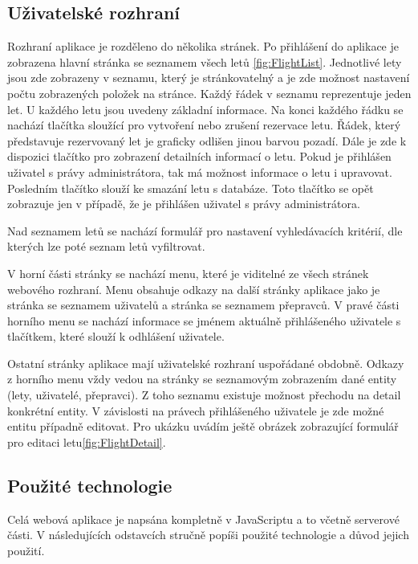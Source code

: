 \documentclass[ing,male,java,dept460]{diploma}						%
\begin{document}
\subsection{Uživatelské rozhraní}
Rozhraní aplikace je rozděleno do několika stránek. Po přihlášení do aplikace je zobrazena hlavní stránka se seznamem všech letů \ref{fig:FlightList}. Jednotlivé lety jsou zde zobrazeny v seznamu, který je stránkovatelný a je zde možnost nastavení počtu zobrazených položek na stránce. Každý řádek v seznamu reprezentuje jeden let. U každého letu jsou uvedeny základní informace. Na konci každého řádku se nachází tlačítka sloužící pro vytvoření nebo zrušení rezervace letu. Řádek, který představuje rezervovaný let je graficky odlišen jinou barvou pozadí. Dále je zde k dispozici tlačítko pro zobrazení detailních informací o letu. Pokud je přihlášen uživatel s právy administrátora, tak má možnost informace o letu i upravovat. Posledním tlačítko slouží ke smazání letu s databáze. Toto tlačítko se opět zobrazuje jen v případě, že je přihlášen uživatel s právy administrátora.


Nad seznamem letů se nachází formulář pro nastavení vyhledávacích kritérií, dle kterých lze poté seznam letů vyfiltrovat.

V horní části stránky se nachází menu, které je viditelné ze všech stránek webového rozhraní. Menu obsahuje odkazy na další stránky aplikace jako je stránka se seznamem uživatelů a stránka se seznamem přepravců. V pravé části horního menu se nachází informace se jménem aktuálně přihlášeného uživatele s tlačítkem, které slouží k odhlášení uživatele.

Ostatní stránky aplikace mají uživatelské rozhraní uspořádané obdobně. Odkazy z horního menu vždy vedou na stránky se seznamovým zobrazením dané entity (lety, uživatelé, přepravci). Z toho seznamu existuje možnost přechodu na detail konkrétní entity. V závislosti na právech přihlášeného uživatele je zde možné entitu případně editovat. Pro ukázku uvádím ještě obrázek zobrazující formulář pro editaci letu\ref{fig:FlightDetail}.


\subsection{Použité technologie}
\label{sec:Pouzite_technologie}
Celá webová aplikace je napsána kompletně v JavaScriptu a to včetně serverové části. V následujících odstavcích stručně popíši použité technologie a důvod jejich použití.
\end{document}
